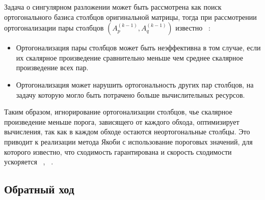 Задача о сингулярном разложении может быть рассмотрена как поиск ортогонального базиса столбцов оригинальной матрицы, тогда при рассмотрении ортогонализации пары столбцов $(A^{(k-1)}_p, A^{(k-1)}_q)$ известно ~\cite{deRijk1989}:
\begin{itemize}
    \item Ортогонализация пары столбцов может быть неэффективна в том случае, если их скалярное произведение сравнительно меньше чем среднее скалярное произведение всех пар.
    \item Ортогонализация может нарушить ортогональность других пар столбцов, на задачу которую могло быть потрачено больше вычислительных ресурсов. 
\end{itemize}
Таким образом, игнорирование ортогонализации столбцов, чье скалярное произведение меньше порога, зависящего от каждого обхода,  оптимизирует вычисления, так как в каждом обходе остаются неортогональные столбцы. Это приводит к реализации метода Якоби с использование пороговых значений, для которого известно, что сходимость гарантирована и скорость сходимости ускоряется ~\cite{Dongarra2018}, ~\cite{Forsythe1960}. \subsection{Обратный ход}


